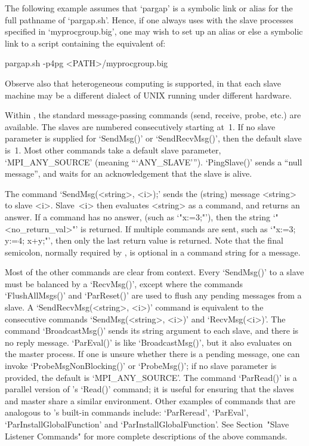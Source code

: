 The following example assumes that `pargap' is a symbolic link  or  alias
for the full pathname of `pargap.sh'. Hence, if one always uses {\ParGAP}
with the slave processes specified in `myprocgroup.big', one may wish  to
set up an alias or else a  symbolic  link  to  a  script  containing  the
equivalent of:

pargap.sh -p4pg <PATH>/myprocgroup.big

Observe also that heterogeneous computing  is  supported,  in  that  each
slave machine may be a different dialect of UNIX running under  different
hardware.

Within {\ParGAP}, the standard message-passing commands  (send,  receive,
probe,  etc.)  are  available.  The  slaves  are  numbered  consecutively
starting at~1. If no slave  parameter  is  supplied  for  `SendMsg()'  or
`SendRecvMsg()', then the default slave is~1. Most other commands take  a
default  slave  parameter,  `MPI_ANY_SOURCE'  (meaning  ```ANY_SLAVE''').
`PingSlave()' sends a ``null message'', and waits for an  acknowledgement
that the slave is alive.

The command `SendMsg(<string>, <i>);' sends the (string) message <string>
to slave <i>. Slave~<i> then evaluates <string> as a {\GAP} command,  and
returns an answer. If a command has no answer, (such as `"x:=3;"'),  then
the string `"<no_return_val>"' is  returned.  If  multiple  commands  are
sent, such as `"x:=3; y:=4; x+y;"', then only the last  return  value  is
returned. Note that the final semicolon, normally required by {\GAP},  is
optional in a command string for a message.

Most of the other commands are clear from context. Every `SendMsg()' to a
slave must be balanced  by  a  `RecvMsg()',  except  where  the  commands
`FlushAllMsgs()' and `ParReset()' are used to flush any pending  messages
from a slave. A `SendRecvMsg(<string>, <i>)' command is equivalent to the
consecutive commands `SendMsg(<string>,  <i>)'  and  `RecvMsg(<i>)'.  The
command `BroadcastMsg()' sends its string argument  to  each  slave,  and
there is no reply message. `ParEval()' is like `BroadcastMsg()',  but  it
also evaluates on the master process. If one is unsure whether there is a
pending message, one can invoke `ProbeMsgNonBlocking()' or  `ProbeMsg()';
if no slave parameter is provided, the default is  `MPI_ANY_SOURCE'.  The
command `ParRead()' is a parallel version of {\GAP}'s  `Read()'  command;
it is useful for ensuring that the slaves  and  master  share  a  similar
environment. Other examples of commands that are  analogous  to  {\GAP}'s
built-in      commands       include:       `ParReread',       `ParEval',
`ParInstallGlobalFunction'    and     `ParInstallGlobalFunction'.     See
Section~"Slave Listener Commands" for more complete descriptions  of  the
above commands.

